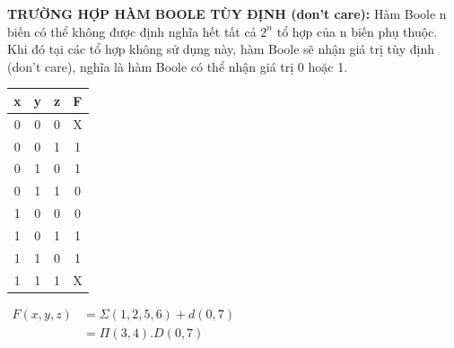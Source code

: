 \textbf{TRƯỜNG HỢP HÀM BOOLE TÙY ĐỊNH (don't care):} Hàm Boole n biến có thể không được định nghĩa hết tất cả $2^n$ tổ hợp của n biến phụ thuộc. Khi đó tại các tổ hợp không sử dụng này, hàm Boole sẽ nhận giá trị tùy định (don't care), nghĩa là hàm Boole có thể nhận giá trị 0 hoặc 1.
\begin{table}[h!]
    \centering
    \begin{tabular}{|ccc|c|}
    \hline
    \textbf{x} & \textbf{y} & \textbf{z} & \textbf{F} \\ \hline
    0          & 0          & 0          & X          \\ 
    0          & 0          & 1          & 1          \\ 
    0          & 1          & 0          & 1          \\ 
    0          & 1          & 1          & 0          \\ 
    1          & 0          & 0          & 0          \\ 
    1          & 0          & 1          & 1          \\ 
    1          & 1          & 0          & 1          \\ 
    1          & 1          & 1          & X          \\ \hline
    \end{tabular}
    \qquad
    $\begin{aligned}
        F(x,y,z) &= \varSigma (1,2,5,6) + d(0,7)\\
                 &= \varPi (3,4). D(0,7)
    \end{aligned}$
\end{table}
